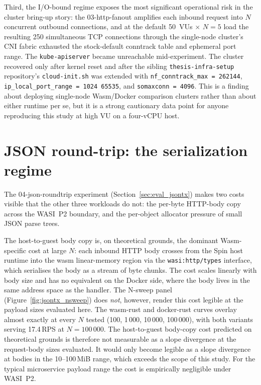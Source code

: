 \begin{sloppypar}
Third, the I/O-bound regime exposes the most significant operational risk in the cluster bring-up story: the 03-http-fanout amplifies each inbound request into $N$ concurrent outbound connections, and at the default 50~\acp{VU} $\times$ $N=5$ load the resulting 250 simultaneous \acs{TCP} connections through the single-node cluster's \acs{CNI} fabric exhausted the stock-default conntrack table and ephemeral port range. The \texttt{kube-apiserver} became unreachable mid-experiment. The cluster recovered only after kernel reset and after the sibling \texttt{thesis-infra-setup} repository's \texttt{cloud-init.sh} was extended with \texttt{nf\_conntrack\_max~=~262144}, \texttt{ip\_local\_port\_range~=~1024~65535}, and \texttt{somaxconn~=~4096}. This is a finding about deploying single-node Wasm/Docker comparison clusters rather than about either runtime per se, but it is a strong cautionary data point for anyone reproducing this study at high \acs{VU} on a four-vCPU host.
\end{sloppypar}

\section{JSON round-trip: the serialization regime}
\label{sec:discussion_jsontx}

The 04-json-roundtrip experiment (Section~\ref{sec:eval_jsontx}) makes two costs visible that the other three workloads do not: the per-byte \acs{HTTP}-body copy across the \acs{WASI}~P2 boundary, and the per-object allocator pressure of small \acs{JSON} parse trees.

\begin{sloppypar}
The host-to-guest body copy is, on theoretical grounds, the dominant Wasm-specific cost at large $N$: each inbound \acs{HTTP} body crosses from the Spin host runtime into the wasm linear-memory region via the \texttt{wasi:http/types} interface, which serialises the body as a stream of byte chunks. The cost scales linearly with body size and has no equivalent on the Docker side, where the body lives in the same address space as the handler. The N-sweep panel (Figure~\ref{fig:jsontx_nsweep}) does \emph{not}, however, render this cost legible at the payload sizes evaluated here. The wasm-rust and docker-rust curves overlay almost exactly at every $N$ tested (100, 1\,000, 10\,000, 100\,000), with both variants serving 17.4\,RPS at $N=100\,000$. The host-to-guest body-copy cost predicted on theoretical grounds is therefore not measurable as a slope divergence at the request-body sizes evaluated. It would only become legible as a slope divergence at bodies in the 10--100\,MiB range, which exceeds the scope of this study. For the typical microservice payload range the cost is empirically negligible under \acs{WASI}~P2.
\end{sloppypar}

